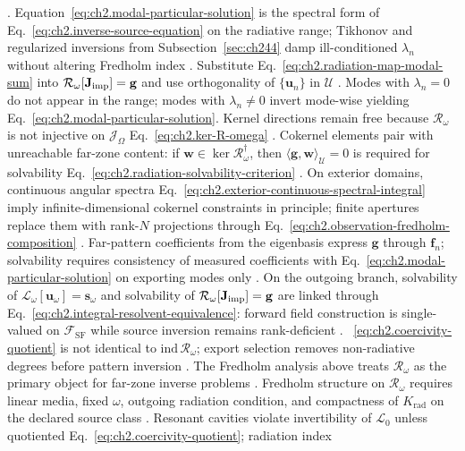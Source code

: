 \cite{stratton1941}. Equation~\eqref{eq:ch2.modal-particular-solution}
is the spectral form of Eq.~\eqref{eq:ch2.inverse-source-equation} on the radiative range;
Tikhonov and regularized inversions from Subsection~\ref{sec:ch244} damp ill-conditioned
\(\lambda_n\) without altering Fredholm index \cite{stratton1941}.
Substitute Eq.~\eqref{eq:ch2.radiation-map-modal-sum} into
\(\mathcal{R}_\omega[\mathbf{J}_{\mathrm{imp}}]=\mathbf{g}\) and use orthogonality of \(\{\mathbf{u}_n\}\) in
\(\mathcal{U}\) \cite{stratton1941}. Modes with \(\lambda_n=0\) do not appear in the range;
modes with \(\lambda_n\neq 0\) invert mode-wise yielding
Eq.~\eqref{eq:ch2.modal-particular-solution}. Kernel directions remain free because
\(\mathcal{R}_\omega\) is not injective on \(\mathcal{J}_\Omega\)
Eq.~\eqref{eq:ch2.ker-R-omega} \cite{harrington2001}.
Cokernel elements pair with unreachable far-zone content: if \(\mathbf{w}\in\ker\mathcal{R}_\omega^{\dagger}\),
then \(\langle \mathbf{g},\mathbf{w}\rangle_{\mathcal{U}}=0\) is required for solvability
Eq.~\eqref{eq:ch2.radiation-solvability-criterion} \cite{stratton1941}. On exterior domains,
continuous angular spectra Eq.~\eqref{eq:ch2.exterior-continuous-spectral-integral} imply
infinite-dimensional cokernel constraints in principle; finite apertures replace them with
rank-\(N\) projections through Eq.~\eqref{eq:ch2.observation-fredholm-composition}
\cite{harrington2001}. Far-pattern coefficients from the eigenbasis express
\(\mathbf{g}\) through \(\mathbf{f}_n\); solvability requires consistency of measured
coefficients with Eq.~\eqref{eq:ch2.modal-particular-solution} on exporting modes only
\cite{stratton1941}.
On the outgoing branch, solvability of \(\mathcal{L}_\omega[\mathbf{u}_\omega]=\mathbf{s}_\omega\)
and solvability of \(\mathcal{R}_\omega[\mathbf{J}_{\mathrm{imp}}]=\mathbf{g}\) are linked through
Eq.~\eqref{eq:ch2.integral-resolvent-equivalence}: forward field construction is single-valued
on \(\mathcal{F}_{\mathrm{SF}}\) while source inversion remains rank-deficient
\cite{stratton1941}. ~\eqref{eq:ch2.coercivity-quotient} is not identical to
\(\mathrm{ind}\,\mathcal{R}_\omega\); export selection removes non-radiative degrees before
pattern inversion \cite{stratton1941}. The Fredholm analysis above treats
\(\mathcal{R}_\omega\) as the primary object for far-zone inverse problems
\cite{harrington2001}.
Fredholm structure on $\mathcal{R}_\omega$ requires linear media, fixed \(\omega\),
outgoing radiation condition, and compactness of \(K_{\mathrm{rad}}\) on the declared source class
\cite{stratton1941}. Resonant cavities violate invertibility of
\(\mathcal{L}_0\) unless quotiented Eq.~\eqref{eq:ch2.coercivity-quotient}; radiation index
